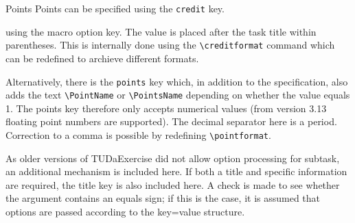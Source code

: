 \documentclass[
	english,%
	accentcolor=9c,%
	points=true, to activate referencing task properties
]{tudaexercise}
\newcommand*{\code}[1]{\texttt{#1}}
\newcommand*{\option}[1]{\texttt{#1}}
\let\tbs\textbackslash
\begin{document}
\begin{task}[credit=10]{Points}
	Points can be specified using the \option{credit} key.

	using the macro \creditformat option key.
	The value is placed after the task title within parentheses.
	This is internally done using the \code{\tbs{}creditformat} command which can be redefined to archieve different formats.

	Alternatively, there is the \option{points} key which, in addition to the specification, also adds the text \code{\tbs{}PointName} or
	\code{\tbs{PointsName}} depending on whether the value equals 1. The points key therefore only accepts numerical
	values (from version 3.13 floating point numbers are supported).
	The decimal separator here is a period.
	Correction to a comma is possible by redefining \code{\tbs{}pointformat}.

	\begin{subtask}[points=1,title={Example for the using \option{points}}]
		As older versions of TUDaExercise did not allow option processing for subtask, an additional mechanism is
		included here.
		If both a title and specific information are required, the title key is also included here.
		A check is made to see whether the argument contains an equals sign; if this is the case, it is assumed that options are passed according to the key=value structure.
	\end{subtask}
\end{task}
\end{document}
